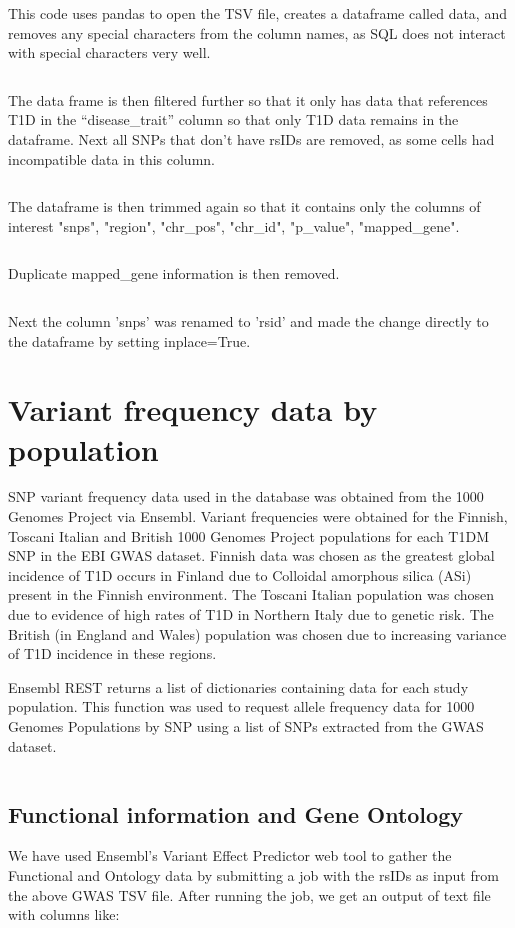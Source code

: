 \documentclass[12pt,a4paper]{article}
\newcommand{\mintfile}[1]{
\begin{tcolorbox}[colback=gray!5!white,%
	grow to left by=20mm,
    grow to right by=20mm,
    sharp corners]{{    \small \inputminted[breaklines]{python}{#1}		}}
\end{tcolorbox}}
\newcommand{\sect}[1]{
\clearpage
\hypertarget{#1}{
\section{#1}\label{#1}}
}
\newcommand{\subsect}[1]{
\FloatBarrier %
\hypertarget{#1}{
\subsection{#1}\label{#1}}
}
\begin{document}
\mintfile{code_snippets/placeholder.py}

This code uses pandas to open the TSV file, creates a dataframe called data, and removes any special characters from the column names, as SQL does not interact with special characters very well.

\mintfile{code_snippets/placeholder.py}
The data frame is then filtered further so that it only has data that references T1D in the “disease\_trait” column so that only T1D data remains in the dataframe. Next all SNPs that don't have rsIDs are removed, as some cells had incompatible data in this column.

\mintfile{code_snippets/placeholder.py}
The dataframe is then trimmed again so that it contains only the columns of interest   "snps", "region", "chr\_pos", "chr\_id", "p\_value", "mapped\_gene".

\mintfile{code_snippets/placeholder.py}
Duplicate mapped\_gene information is then removed.

\mintfile{code_snippets/placeholder.py}
Next the column 'snps' was renamed to 'rsid' and made the change directly to the dataframe by setting inplace=True.


\sect{Variant frequency data by population}
SNP variant frequency data used in the database was obtained from the 1000 Genomes Project via Ensembl. Variant frequencies were obtained for the Finnish, Toscani Italian and British 1000 Genomes Project populations for each T1DM SNP in the EBI GWAS dataset. Finnish data was chosen as the greatest global incidence of T1D occurs in Finland due to  Colloidal amorphous silica (ASi) present in the Finnish environment. The Toscani Italian population was chosen due to evidence of high rates of T1D in Northern Italy due to genetic risk. The British (in England and Wales) population was chosen due to increasing variance of T1D incidence in these regions. 

Ensembl REST returns a list of dictionaries containing data for each study population. This function was used to request allele frequency data for 1000 Genomes Populations by SNP using a list of SNPs extracted from the GWAS dataset.

\mintfile{code_snippets/freq.py}

\subsect{Functional information and Gene Ontology}

We have used Ensembl's Variant Effect Predictor web tool to gather the Functional and Ontology data by
submitting a job with the rsIDs as input from the above GWAS TSV file.
After running the job, we get an output of text file with columns like:
\end{document}
